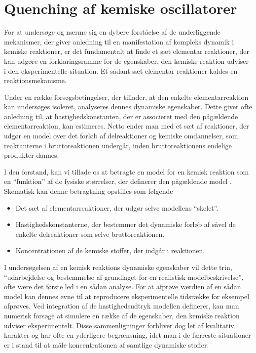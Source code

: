 \chapter{Quenching af kemiske oscillatorer}
\label{cha:Quench}
For at unders{\o}ge og n{\ae}rme sig en dybere
forst{\aa}else af de underliggende meka\-nis\-mer, der
giver anledning til en manifestation af kompleks dynamik i
kemiske reaktioner, er det fundamentalt at finde et s{\ae}t
elementar reaktioner, der kan udg{\o}re en forklaringsramme
for de egenskaber, den kemiske reaktion udviser i den
eksperimentelle situation. Et s{\aa}dant s{\ae}t elementar
reaktioner kaldes en reaktionsmekanisme.

\vspace{4.0mm}
Under en r{\ae}kke fors{\o}gsbetingelser, der tillader, at
den enkelte elementarreaktion kan unders{\o}ges isoleret,
analyseres dennes dynamiske egenskaber. Dette giver ofte
anledning til, at hastighedskonstanten, der er associeret
med den p{\aa}g{\ae}ldende elementarreaktion, kan
estimeres. Netto ender man med et s{\ae}t af reaktioner,
der udg{\o}r en model over det forl{\o}b af delreaktioner
og kemiske omdannelser, som reaktanterne i bruttoreaktionen
underg{\aa}r, inden bruttoreaktionens endelige produkter
dannes.

\vspace{4.0mm}
I den forstand, kan vi tillade os at betragte en model for
en kemisk reaktion som en ``funktion'' af de fysiske
st{\o}rrelser, der definerer den p{\aa}g{\ae}ldende model
\cite{HopfQuench}. Skematisk kan denne betragtning
opstilles som f{\o}lgende

\begin{itemize}
 \item Det s{\ae}t af elementarreaktioner, der udg{\o}r
  selve modellens ``skelet''.
 \item Hastighedskonstanterne, der bestemmer det dynamiske
  forl{\o}b af s{\aa}vel de enkelte delreaktioner som selve
  bruttoreaktionen.
 \item Koncentrationen af de kemiske stoffer, der
  indg{\aa}r i reaktionen.
\end{itemize}

I unders{\o}gelsen af en kemisk reaktions dynamiske
egenskaber vil dette trin, ``udarbejdelse og bestemmelse af
grundlaget for en realistisk model\-beskrivelse'', ofte
v{\ae}re det f{\o}rste led i en s{\aa}dan analyse. For at
afpr{\o}ve v{\ae}rdien af en s{\aa}dan model kan dennes
evne til at reproducere eksperimentelle tidsr{\ae}kke for
eksempel afpr{\o}ves. Ved integration af de
hastighedsudtryk model\-len definerer, kan man numerisk
fors{\o}ge at simulere en r{\ae}kke af de egenskaber, den
kemiske reaktion udviser eksperimentelt. Disse
sammenligninger forbliver dog let af kvalitativ karakter og
har ofte en yderligere begr{\ae}nsning, idet man i de
f{\ae}rreste situationer er i stand til at m{\aa}le
koncentrationen af samtlige dynamiske stoffer.

